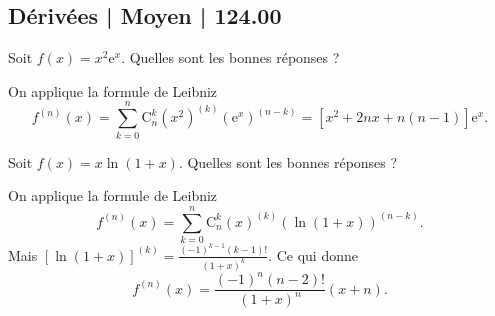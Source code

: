 \subsection{Dérivées | Moyen | 124.00}




\begin{question}
Soit $\displaystyle f(x)=x^2\mathrm{e}^x$. Quelles sont les bonnes réponses ?
\begin{answers}  
\end{answers}
\begin{explanations}
On applique la formule de Leibniz 
$$\displaystyle f^{(n)}(x)=\sum _{k=0}^n\mathrm{C}_n^k(x^2)^{(k)}(\mathrm{e}^x)^{(n-k)}=[x^2+2nx+n(n-1)]\mathrm{e}^x.$$
\end{explanations}
\end{question}



\begin{question}
Soit $\displaystyle f(x)=x\ln (1+x)$. Quelles sont les bonnes réponses ?
\begin{answers}  
\end{answers}
\begin{explanations}
On applique la formule de Leibniz 
$$\displaystyle f^{(n)}(x)=\sum _{k=0}^n\mathrm{C}_n^k(x)^{(k)}(\ln (1+x))^{(n-k)}.$$
Mais $\displaystyle \left[\ln (1+x)\right]^{(k)}=\frac{(-1)^{k-1}(k-1)!}{(1+x)^k}$. Ce qui donne
$$f^{(n)}(x)=\frac{(-1)^{n}(n-2)!}{(1+x)^n}\left(x+n\right).$$
\end{explanations}
\end{question}




